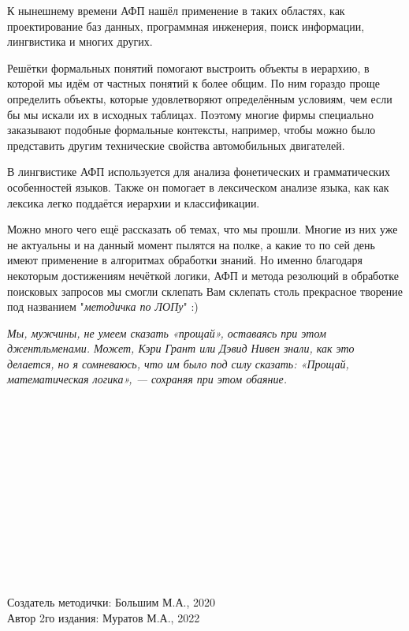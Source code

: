 \documentclass[18pt, a4paper]{extarticle}
\begin{document}
К нынешнему времени АФП нашёл применение в таких областях, как проектирование баз данных, программная инженерия, поиск информации, лингвистика и многих других.

Решётки формальных понятий помогают выстроить объекты в иерархию, в которой мы идём от частных понятий к более общим. По ним гораздо проще определить объекты, которые удовлетворяют определённым условиям, чем если бы мы искали
их в исходных таблицах. Поэтому многие фирмы специально заказывают подобные формальные контексты, например, чтобы можно было представить другим технические свойства автомобильных двигателей.

В лингвистике АФП используется для анализа фонетических и грамматических особенностей языков. Также он помогает в лексическом анализе языка, как как лексика легко поддаётся иерархии и классификации.

Можно много чего ещё рассказать об темах, что мы прошли. Многие из них уже не актуальны и на данный момент пылятся на полке, а какие то по сей день имеют применение в алгоритмах обработки знаний. Но именно благодаря некоторым достижениям нечёткой логики, АФП и метода резолюций в обработке поисковых запросов мы смогли склепать Вам склепать столь прекрасное творение под названием "\textit{методичка по ЛОПу}"{} :) \\

\begin{center}
    \textit{Мы, мужчины, не умеем сказать «прощай», оставаясь при этом джентльменами. Может, Кэри Грант или Дэвид Нивен знали, как это делается, но я сомневаюсь, что им было под силу сказать: «Прощай, математическая логика», — сохраняя при этом обаяние.}
\end{center}
\leavevmode\\\\\leavevmode\\\\\leavevmode\\\\\leavevmode\\\\\leavevmode\\\\\leavevmode\\\\
\begin{flushright}
	Создатель методички: Большим М.А., 2020\\
	Автор 2го издания: Муратов М.А., 2022
\end{flushright}
\end{document}
